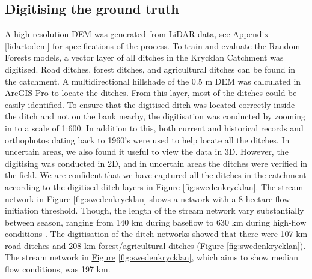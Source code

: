 \documentclass[]{interact}
\theoremstyle{plain}%
\theoremstyle{definition}
\theoremstyle{remark}
\begin{document}
\subsection{Digitising the ground truth}
A high resolution DEM was generated from LiDAR data, see \hyperref[lidartodem]{Appendix} \ref{lidartodem} for specifications of the process. To train and evaluate the Random Forests models, a vector layer of all ditches in the Krycklan Catchment \citep{krycklancatchment} was digitised. Road ditches, forest ditches, and agricultural ditches can be found in the catchment. A multidirectional hillshade of the 0.5 m DEM was calculated in ArcGIS Pro to locate the ditches. From this layer, most of the ditches could be easily identified. To ensure that the digitised ditch was located correctly inside the ditch and not on the bank nearby, the digitisation was conducted by zooming in to a scale of 1:600. In addition to this, both current and historical records and orthophotos dating back to 1960’s were used to help locate all the ditches. In uncertain areas, we also found it useful to view the data in 3D. However, the digitising was conducted in 2D, and in uncertain areas the ditches were verified in the field. We are confident that we have captured all the ditches in the catchment according to the digitised  ditch layers in \hyperref[fig:swedenkrycklan]{Figure} \ref{fig:swedenkrycklan}. The stream network in \hyperref[fig:swedenkrycklan]{Figure} \ref{fig:swedenkrycklan} shows a network with a 8 hectare flow initiation threshold. Though, the length of the stream network vary substantially between season, ranging from 140 km during baseflow to 630 km during high-flow conditions \citep{mappingtemporal}. The digitisation of the ditch networks showed that there were 107 km road ditches and 208 km forest/agricultural ditches (\hyperref[fig:swedenkrycklan]{Figure} \ref{fig:swedenkrycklan}). The stream network in \hyperref[fig:swedenkrycklan]{Figure} \ref{fig:swedenkrycklan}, which aims to show median flow conditions, was 197 km.
\end{document}
